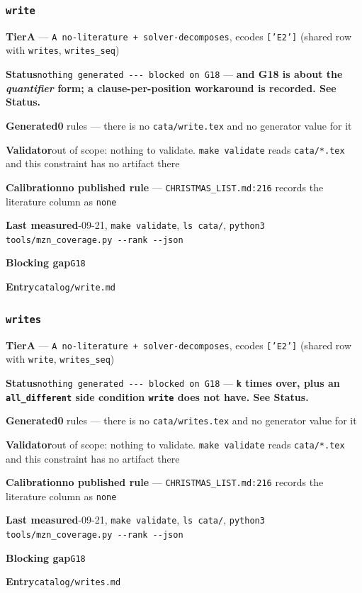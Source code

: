 \documentclass[10pt,a4paper]{article}
\newcommand{\entryfield}[2]{{\raggedright\textbf{#1}\quad #2\par}}
\begin{document}
\subsubsection*{\texttt{write}}
\label{entry:write}
\entryfield{Tier}{\textbf{A} --- \texttt{A no-\allowbreak{}literature + solver-\allowbreak{}decomposes}, ecodes \texttt{['E2']} (shared row with \texttt{writes}, \texttt{writes\_seq})}
\entryfield{Status}{\texttt{nothing generated -\allowbreak{}-\allowbreak{}-\allowbreak{} blocked on G18} --- \textbf{and G18 is about the \emph{quantifier} form; a clause-per-position workaround is recorded. See Status.}}
\entryfield{Generated}{\textbf{0} rules --- there is no \texttt{cata/write.tex} and no generator value for it}
\entryfield{Validator}{out of scope: nothing to validate. \texttt{make validate} reads \texttt{cata/*.tex} and this constraint has no artifact there}
\entryfield{Calibration}{\textbf{no published rule} --- \texttt{CHRISTMAS\_LIST.md:216} records the literature column as \texttt{none}}
\entryfield{Last measured}{2026-09-21, \texttt{make validate}, \texttt{ls cata/}, \texttt{python3 tools/\allowbreak{}mzn\_\allowbreak{}coverage.\allowbreak{}py -\allowbreak{}-\allowbreak{}rank -\allowbreak{}-\allowbreak{}json}}
\entryfield{Blocking gap}{\texttt{G18}}
\entryfield{Entry}{\texttt{catalog/write.md}}
\subsubsection*{\texttt{writes}}
\label{entry:writes}
\entryfield{Tier}{\textbf{A} --- \texttt{A no-\allowbreak{}literature + solver-\allowbreak{}decomposes}, ecodes \texttt{['E2']} (shared row with \texttt{write}, \texttt{writes\_seq})}
\entryfield{Status}{\texttt{nothing generated -\allowbreak{}-\allowbreak{}-\allowbreak{} blocked on G18} --- \textbf{\texttt{k} times over, plus an \texttt{all\_different} side condition \texttt{write} does not have. See Status.}}
\entryfield{Generated}{\textbf{0} rules --- there is no \texttt{cata/writes.tex} and no generator value for it}
\entryfield{Validator}{out of scope: nothing to validate. \texttt{make validate} reads \texttt{cata/*.tex} and this constraint has no artifact there}
\entryfield{Calibration}{\textbf{no published rule} --- \texttt{CHRISTMAS\_LIST.md:216} records the literature column as \texttt{none}}
\entryfield{Last measured}{2026-09-21, \texttt{make validate}, \texttt{ls cata/}, \texttt{python3 tools/\allowbreak{}mzn\_\allowbreak{}coverage.\allowbreak{}py -\allowbreak{}-\allowbreak{}rank -\allowbreak{}-\allowbreak{}json}}
\entryfield{Blocking gap}{\texttt{G18}}
\entryfield{Entry}{\texttt{catalog/writes.md}}
\end{document}

